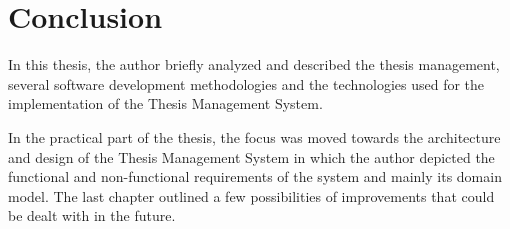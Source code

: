 \chapter{Conclusion}

In this thesis, the author briefly analyzed and described the thesis management, several software development methodologies and the technologies used for the implementation of the Thesis Management System.

In the practical part of the thesis, the focus was moved towards the architecture and design of the Thesis Management System in which the author depicted the functional and non-functional requirements of the system and mainly its domain model. The last chapter outlined a few possibilities of improvements that could be 
dealt with in the future.
